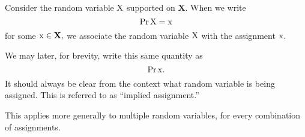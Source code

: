 \begin{note}
  \def\X{{\mathbf X}}
  \def\XV{{\rm X}}
  \def\XX{{\rm x}}
  Consider the random variable $\XV$ supported on $\X$. 
  When we write $$\Pr{\XV = \XX}$$
  for some $\XX \in \X,$
  we associate the random variable $\XV$ with the assignment $\XX$.

  We may later, for brevity, write this same quantity
  as $$\Pr{\XX}.$$
  It should always be clear from the context what random variable is being assigned.
  This is referred to as ``implied assignment.''

  This applies more generally to multiple random variables,
  for every combination of assignments.
\end{note}
